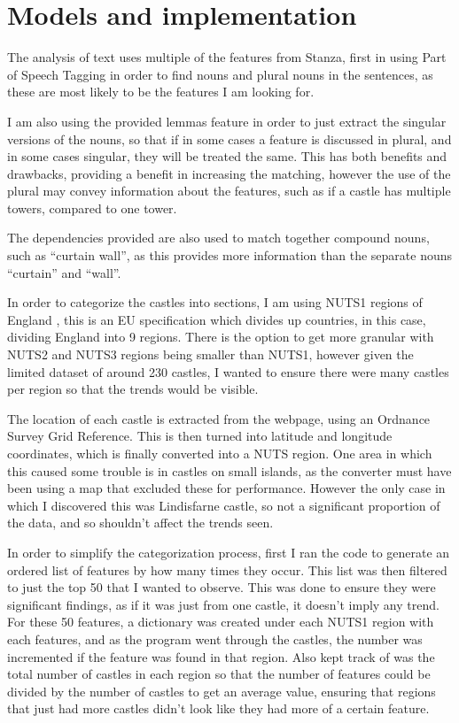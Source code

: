 \documentclass[11pt]{article}
\begin{document}
\section{Models and implementation}

The analysis of text uses multiple of the features from Stanza, first in using Part of Speech Tagging in order to find nouns and plural nouns in the sentences, as these are most likely to be the features I am looking for.

I am also using the provided lemmas feature in order to just extract the singular versions of the nouns, so that if in some cases a feature is discussed in plural, and in some cases singular, they will be treated the same. This has both benefits and drawbacks, providing a benefit in increasing the matching, however the use of the plural may convey information about the features, such as if a castle has multiple towers, compared to one tower.

The dependencies provided are also used to match together compound nouns, such as “curtain wall”, as this provides more information than the separate nouns “curtain” and “wall”.

In order to categorize the castles into sections, I am using NUTS1 regions of England \cite{nuts}, this is an EU specification which divides up countries, in this case, dividing England into 9 regions. There is the option to get more granular with NUTS2 and NUTS3 regions being smaller than NUTS1, however given the limited dataset of around 230 castles, I wanted to ensure there were many castles per region so that the trends would be visible.

The location of each castle is extracted from the webpage, using an Ordnance Survey Grid Reference. This is then turned into latitude and longitude coordinates, which is finally converted into a NUTS region. One area in which this caused some trouble is in castles on small islands, as the converter must have been using a map that excluded these for performance. However the only case in which I discovered this was Lindisfarne castle, so not a significant proportion of the data, and so shouldn't affect the trends seen.

In order to simplify the categorization process, first I ran the code to generate an ordered list of features by how many times they occur. This list was then filtered to just the top 50 that I wanted to observe. This was done to ensure they were significant findings, as if it was just from one castle, it doesn't imply any trend. For these 50 features, a dictionary was created under each NUTS1 region with each features, and as the program went through the castles, the number was incremented if the feature was found in that region. Also kept track of was the total number of castles in each region so that the number of features could be divided by the number of castles to get an average value, ensuring that regions that just had more castles didn't look like they had more of a certain feature.
\end{document}
